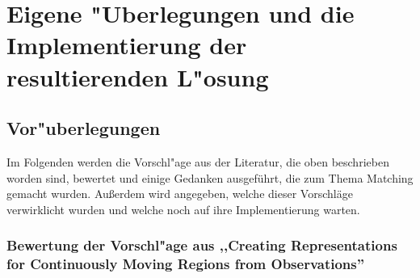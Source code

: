 \chapter[Eigene "Uberlegungen und die Implementierung]{Eigene "Uberlegungen und die Implementierung der resultierenden L"osung}
\minitoc
\newpage
\section{Vor"uberlegungen} \label{vorueberlegungen}
Im Folgenden werden die Vorschl"age aus der Literatur, die oben beschrieben worden sind, bewertet und einige Gedanken ausgeführt, die zum Thema Matching gemacht wurden. Außerdem wird  angegeben, welche dieser Vorschläge verwirklicht wurden und welche noch auf ihre Implementierung warten.

\subsection[Bewertung der Vorschl"age aus \cite{TG}]{Bewertung der Vorschl"age aus ,,Creating Representations for Continuously Moving Regions from Observations''\cite{TG}}

